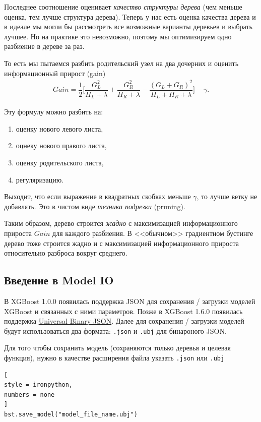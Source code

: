 \documentclass[%
	11pt,
	a4paper,
	utf8,
		]{article}
\begin{document}
Последнее соотношение оценивает \emph{качество структуры дерева} (чем меньше оценка, тем лучше структура дерева). Теперь у нас есть оценка качества дерева и в идеале мы могли бы рассмотреть все возможные варианты деревьев и выбрать лучшее. Но на практике это невозможно, поэтому мы оптимизируем одно разбиение в дереве за раз. 

То есть мы пытаемся разбить родительский узел на два дочерних и оценить информационный прирост (gain)
\begin{align*}
	Gain = \dfrac{1}{2} \Big[ \dfrac{G_L^2}{ H_L + \lambda } + \dfrac{G_R^2}{H_R + \lambda} - \dfrac{ (G_L + G_R)^2 }{ H_L +H_R +\lambda } \Big] - \gamma.
\end{align*}

Эту формулу можно разбить на:
\begin{enumerate}
	\item оценку нового левого листа,
	
	\item оцнеку нового правого листа,
	
	\item оценку родительского листа,
	
	\item регуляризацию.
\end{enumerate}

Выходит, что если выражение в квадратных скобках меньше $ \gamma $, то лучше ветку не добавлять. Это в чистом виде \emph{техника подрезки} (pruning).

Таким образом, дерево строится \emph{жадно} с максимизацией информационного прироста $ Gain $ для каждого разбиения. В <<обычном>> градиентном бустинге дерево тоже строится жадно и с максимизацией информационного прироста относительно разброса вокруг среднего.

\subsection{Введение в Model IO}

В XGBoost 1.0.0 появилась поддержка JSON для сохранения / загрузки моделей XGBoost и связанных с ними параметров. Позже в XGBoost 1.6.0 появилась поддержка \href{https://ubjson.org/}{Universal Binary JSON}. Далее для сохранения / загрузки моделей будут использоваться два формата: \verb|.json| и \verb|.ubj| для бинароного JSON.

Для того чтобы сохранить модель (сохраняются только деревья и целевая функция), нужно в качестве расширения файла указать \verb|.json| или \verb|.ubj|
\begin{lstlisting}[
style = ironpython,
numbers = none
]
bst.save_model("model_file_name.ubj")
\end{lstlisting}
\end{document}
